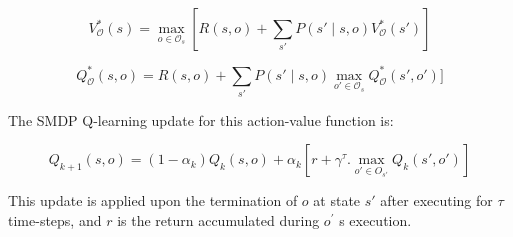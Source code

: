 \begin{equation}
    V_\mathcal{O}^* (s)=\max_{o \in  \mathcal{O}_s }⁡[R(s,o)  +\sum_{s'}P(s' \mid s,o) V_\mathcal{O}^* (s')]
\end{equation}

\begin{equation}
    Q_\mathcal{O}^* (s,o) = R(s,o) + \sum_{s'} P(s'\mid s,o)   \max_{o' \in \mathcal{O}_s } ⁡Q_\mathcal{O}^* (s',o')]
\end{equation}

The SMDP Q-learning update for this action-value function is:

\begin{equation}
    Q_{k+1} (s,o)=(1-\alpha_k ) Q_k (s,o)+\alpha_k [r+ \gamma^\tau.   \max_{o' \in O_{s'}}⁡ Q_k (s',o' )]
\end{equation}


This update is applied upon the termination of \(o\) at state \(s'\) after executing for \(\tau\) time-steps, and \(r\) is the return accumulated during \(o^'\) s execution.  \\

    
